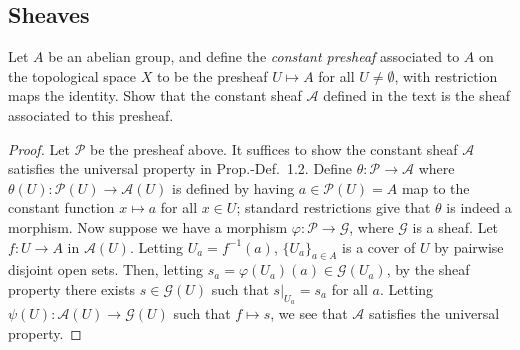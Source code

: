 \documentclass[10pt]{article}
\theoremstyle{definition}
\theoremstyle{remark}
\numberwithin{equation}{section}
\numberwithin{figure}{subsubsection}
\begin{document}
\subsection{Sheaves}
\begin{problem}
  Let $A$ be an abelian group, and define the \emph{constant presheaf} associated to $A$ on the topological space $X$ to be the presheaf $U \mapsto A$ for all $U \ne \emptyset$, with restriction maps the identity. Show that the constant sheaf $\mathscr{A}$ defined in the text is the sheaf associated to this presheaf.
\end{problem}
\begin{proof}
  Let $\mathcal{P}$ be the presheaf above. It suffices to show the constant sheaf $\mathscr{A}$ satisfies the universal property in Prop.-Def.~1.2. Define $\theta\colon\mathcal{P} \to \mathscr{A}$ where $\theta(U)\colon\mathcal{P}(U)\to\mathscr{A}(U)$ is defined by having $a \in \mathcal{P}(U) = A$ map to the constant function $x \mapsto a$ for all $x \in U$; standard restrictions give that $\theta$ is indeed a morphism. Now suppose we have a morphism $\varphi\colon\mathcal{P}\to\mathscr{G}$, where $\mathscr{G}$ is a sheaf. Let $f\colon U\to A$ in $\mathscr{A}(U)$. Letting $U_a = f^{-1}(a)$, $\{U_a\}_{a \in A}$ is a cover of $U$ by pairwise disjoint open sets. Then, letting $s_a = \varphi(U_a)(a) \in \mathscr{G}(U_a)$, by the sheaf property there exists $s \in \mathscr{G}(U)$ such that $s\vert_{U_a} = s_a$ for all $a$. Letting $\psi(U)\colon\mathscr{A}(U) \to \mathscr{G}(U)$ such that $f \mapsto s$, we see that $\mathscr{A}$ satisfies the universal property.
\end{proof}
\end{document}
